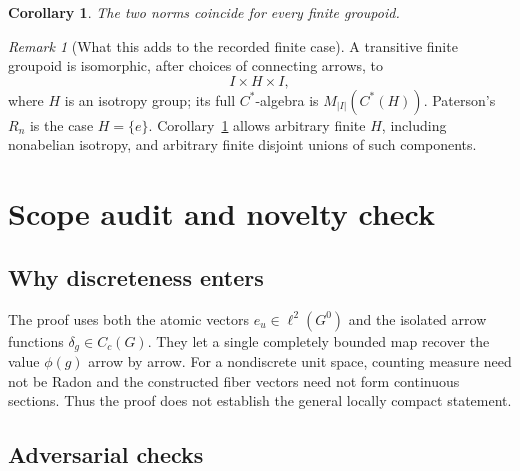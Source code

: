 \documentclass[11pt]{article}
\newtheorem{corollary}[theorem]{Corollary}
\theoremstyle{remark}
\newtheorem{remark}[theorem]{Remark}
\begin{document}
\begin{corollary}\label{cor:finite}
The two norms coincide for every finite groupoid.
\end{corollary}

\begin{remark}[What this adds to the recorded finite case]
A transitive finite groupoid is isomorphic, after choices of connecting
arrows, to
\[
 I\times H\times I,
\]
where \(H\) is an isotropy group; its full \(C^*\)-algebra is
\(M_{|I|}(C^*(H))\).  Paterson's \(R_n\) is the case \(H=\{e\}\).
Corollary~\ref{cor:finite} allows arbitrary finite \(H\), including
nonabelian isotropy, and arbitrary finite disjoint unions of such components.
\end{remark}

\section{Scope audit and novelty check}

\subsection*{Why discreteness enters}

The proof uses both the atomic vectors \(e_u\in\ell^2(G^0)\) and the isolated
arrow functions \(\delta_g\in C_c(G)\).  They let a single completely bounded
map recover the value \(\phi(g)\) arrow by arrow.  For a nondiscrete unit
space, counting measure need not be Radon and the constructed fiber vectors
need not form continuous sections.  Thus the proof does not establish the
general locally compact statement.

\subsection*{Adversarial checks}
\end{document}
